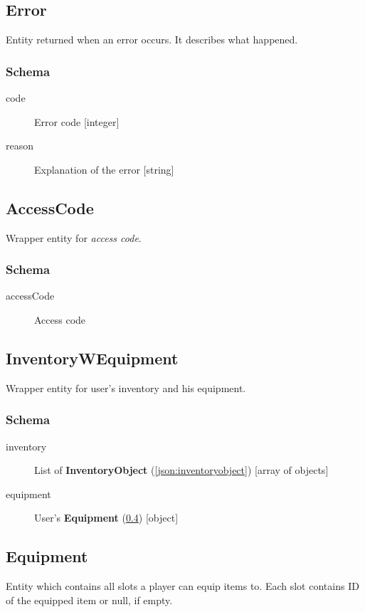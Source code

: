 	\subsection{Error}
		\label{json:error}
		Entity returned when an error occurs. It describes what happened.
		\subsubsection{Schema}
			\begin{description}
				\item[code] Error code [integer]
				\item[reason] Explanation of the error [string]
			\end{description}

	\subsection{AccessCode}
		\label{json:accesscode}
		Wrapper entity for \textit{access code}.
		\subsubsection{Schema}
			\begin{description}
				\item[accessCode] Access code
			\end{description}

	\subsection{InventoryWEquipment}
		\label{json:inventoryequipment}
		Wrapper entity for user's inventory and his equipment.		
		\subsubsection{Schema}
			\begin{description}
				\item[inventory] List of \textbf{InventoryObject} (\ref{json:inventoryobject}) [array of objects]
				\item[equipment] User's \textbf{Equipment} (\ref{json:equipment}) [object]
			\end{description}
	
	\subsection{Equipment}
		\label{json:equipment}
		Entity which contains all slots a player can equip items to. Each slot contains ID of the equipped item or null, if empty. 
